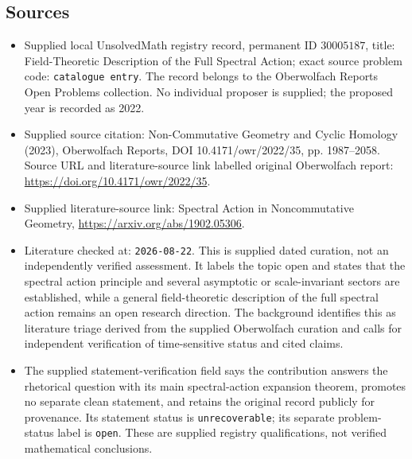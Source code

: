 \documentclass[11pt]{article}
\begin{document}
\subsection{Sources}
\begin{itemize}
\item Supplied local UnsolvedMath registry record, permanent ID \(30005187\), title: Field-Theoretic Description of the Full Spectral Action; exact source problem code: \texttt{catalogue entry}. The record belongs to the Oberwolfach Reports Open Problems collection. No individual proposer is supplied; the proposed year is recorded as 2022.
\item Supplied source citation: Non-Commutative Geometry and Cyclic Homology (2023), Oberwolfach Reports, DOI 10.4171/owr/2022/35, pp. 1987--2058. Source URL and literature-source link labelled original Oberwolfach report: \url{https://doi.org/10.4171/owr/2022/35}.
\item Supplied literature-source link: Spectral Action in Noncommutative Geometry, \url{https://arxiv.org/abs/1902.05306}.
\item Literature checked at: \texttt{2026-08-22}. This is supplied dated curation, not an independently verified assessment. It labels the topic open and states that the spectral action principle and several asymptotic or scale-invariant sectors are established, while a general field-theoretic description of the full spectral action remains an open research direction. The background identifies this as literature triage derived from the supplied Oberwolfach curation and calls for independent verification of time-sensitive status and cited claims.
\item The supplied statement-verification field says the contribution answers the rhetorical question with its main spectral-action expansion theorem, promotes no separate clean statement, and retains the original record publicly for provenance. Its statement status is \texttt{unrecoverable}; its separate problem-status label is \texttt{open}. These are supplied registry qualifications, not verified mathematical conclusions.
\end{itemize}
\end{document}
